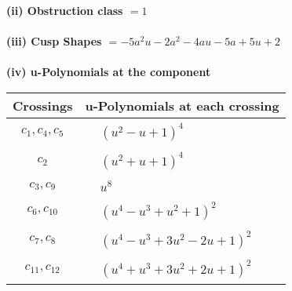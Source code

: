 \documentclass[1p]{elsarticle_modified}
\theoremstyle{definition}
\begin{document}
\flushleft \textbf{(ii) Obstruction class $= 1$}\\~\\
\flushleft \textbf{(iii) Cusp Shapes $= -5 a^2 u-2 a^2-4 a u-5 a+5 u+2$}\\~\\
\newpage\renewcommand{\arraystretch}{1}
\flushleft \textbf{(iv) u-Polynomials at the component}\newline \\
\begin{tabular}{m{50pt}|m{274pt}}
Crossings & \hspace{64pt}u-Polynomials at each crossing \\
\hline $$\begin{aligned}c_{1},c_{4},c_{5}\end{aligned}$$&$\begin{aligned}
&(u^2- u+1)^4
\end{aligned}$\\
\hline $$\begin{aligned}c_{2}\end{aligned}$$&$\begin{aligned}
&(u^2+u+1)^4
\end{aligned}$\\
\hline $$\begin{aligned}c_{3},c_{9}\end{aligned}$$&$\begin{aligned}
&u^8
\end{aligned}$\\
\hline $$\begin{aligned}c_{6},c_{10}\end{aligned}$$&$\begin{aligned}
&(u^4- u^3+u^2+1)^2
\end{aligned}$\\
\hline $$\begin{aligned}c_{7},c_{8}\end{aligned}$$&$\begin{aligned}
&(u^4- u^3+3 u^2-2 u+1)^2
\end{aligned}$\\
\hline $$\begin{aligned}c_{11},c_{12}\end{aligned}$$&$\begin{aligned}
&(u^4+u^3+3 u^2+2 u+1)^2
\end{aligned}$\\
\hline
\end{tabular}\\~\\
\end{document}
